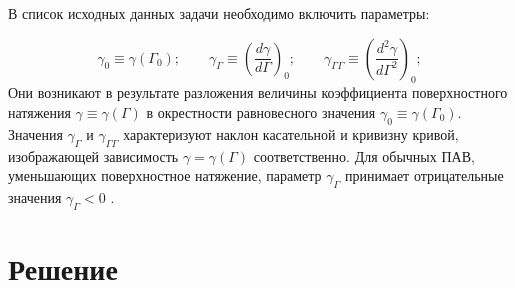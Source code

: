 В список исходных данных задачи необходимо включить параметры:

\begin{equation*}
\qquad \gamma_{0} \equiv \gamma \left( \Gamma_{0} \right); \qquad \gamma_{\Gamma} \equiv \left(\dfrac{d \gamma}{d \Gamma} \right)_{0}; \qquad \gamma_{\Gamma \Gamma} \equiv \left( \dfrac{d^{2} \gamma}{d \Gamma^{2}} \right)_{0}; \qquad
\end{equation*}
Они возникают в результате разложения величины коэффициента поверхностного натяжения $ \gamma \equiv \gamma \left( \Gamma \right) $ в окрестности равновесного значения $ \gamma_{0} \equiv \gamma \left( \Gamma_{0} \right)  $. Значения $ \gamma_{\Gamma} $ и $ \gamma_{\Gamma \Gamma} $ характеризуют наклон касательной и кривизну кривой, изображающей зависимость $ \gamma = \gamma \left( \Gamma \right) $ соответственно. Для обычных ПАВ, уменьшающих поверхностное натяжение, параметр $ \gamma_{\Gamma} $ принимает отрицательные значения $ \gamma_{\Gamma}<0 $ \parencite{lucassen1969eh, Levich}.

  \section{Решение}

